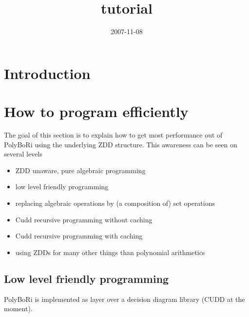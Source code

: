 \documentclass[]{article}
\title{\PolyBoRi tutorial}
\author{  }
\date{2007-11-08}
\newcommand{\PolyBoRi}{{\sc PolyBoRi}\xspace}
\newcommand{\CUDD}{{CUDD}\xspace}
\begin{document}
\ifpdf
{}
\else
{}
\fi

\maketitle


\begin{abstract}
\end{abstract}

\section{Introduction}
\section{How to program efficiently}
The goal of this section is to explain how to get most performance out of \PolyBoRi using the underlying ZDD structure.
This awareness can be seen on several levels
\begin{itemize}
    \item ZDD unaware, pure algebraic programming 
    \item low level friendly programming
    \item replacing algebraic operations by (a composition of) set operations
    \item Cudd recursive programming without caching
    \item Cudd recursive programming with caching
    \item using ZDDs for many other things than polynomial arithmetics
\end{itemize}
\subsection{Low level friendly programming}
\label{low-level-friendly}
\PolyBoRi is implemented as layer over a decision diagram library (\CUDD at the moment).
\end{document}
